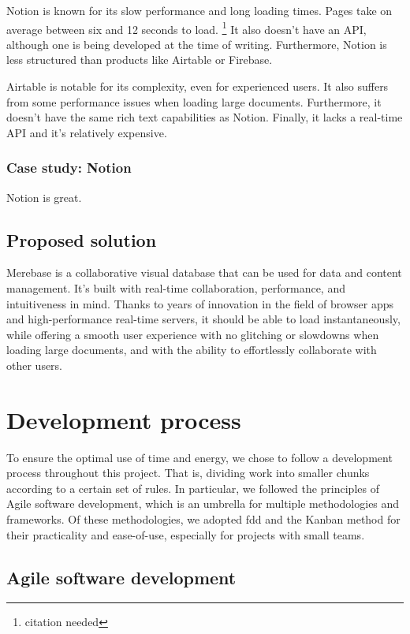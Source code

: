 Notion is known for its slow performance and long loading times. Pages
take on average between six and 12 seconds to load. \footnote{citation
	needed} It also doesn't have an API, although one is being developed
at the time of writing. Furthermore, Notion is less structured than
products like Airtable or Firebase.

Airtable is notable for its complexity, even for experienced users. It
also suffers from some performance issues when loading large documents.
Furthermore, it doesn't have the same rich text capabilities as Notion.
Finally, it lacks a real-time API and it's relatively expensive.

\subsubsection{Case study: Notion}

Notion is great.

\subsection{Proposed solution}

Merebase is a collaborative visual database that can be used for data
and content management. It's built with real-time collaboration,
performance, and intuitiveness in mind. Thanks to years of innovation in
the field of browser apps and high-performance real-time servers, it
should be able to load instantaneously, while offering a smooth user
experience with no glitching or slowdowns when loading large documents,
and with the ability to effortlessly collaborate with other users.

\section{Development process}

To ensure the optimal use of time and energy, we chose to follow a development process throughout this project.
That is, dividing work into smaller chunks according to a certain set of rules. In particular, we followed the principles of Agile software development, which is an umbrella for multiple methodologies and frameworks.
Of these methodologies, we adopted \acrfull{fdd} and the Kanban method for their practicality and ease-of-use, especially for projects with small teams.

\subsection{Agile software development}

